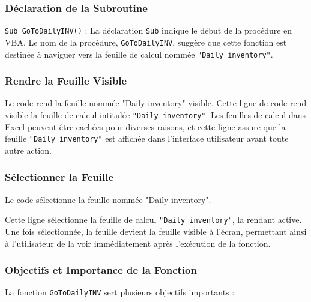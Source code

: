 \documentclass[a4paper, oneside, 12pt, final]{extreport}
\begin{document}
\subsubsection{Déclaration de la Subroutine}

\texttt{Sub GoToDailyINV()} : La déclaration \texttt{Sub} indique le début de la procédure en VBA. Le nom de la procédure, \texttt{GoToDailyINV}, suggère que cette fonction est destinée à naviguer vers la feuille de calcul nommée \texttt{"Daily inventory"}.

\subsubsection{Rendre la Feuille Visible}
Le code rend la feuille nommée "Daily inventory" visible.
Cette ligne de code rend visible la feuille de calcul intitulée \texttt{"Daily inventory"}. Les feuilles de calcul dans Excel peuvent être cachées pour diverses raisons, et cette ligne assure que la feuille \texttt{"Daily inventory"} est affichée dans l'interface utilisateur avant toute autre action.

\subsubsection{Sélectionner la Feuille}
Le code sélectionne la feuille nommée "Daily inventory".

Cette ligne sélectionne la feuille de calcul \texttt{"Daily inventory"}, la rendant active. Une fois sélectionnée, la feuille devient la feuille visible à l'écran, permettant ainsi à l'utilisateur de la voir immédiatement après l'exécution de la fonction.

\subsubsection{Objectifs et Importance de la Fonction}

La fonction \texttt{GoToDailyINV} sert plusieurs objectifs importants :
\end{document}
